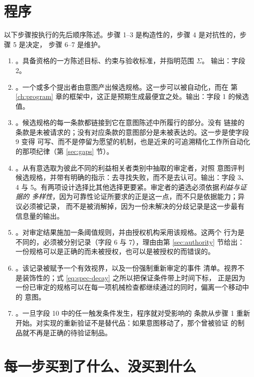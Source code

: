 \section{程序}

以下步骤按执行的先后顺序陈述。步骤 1--3 是构造性的，步骤 4 是对抗性的，步骤 5 是决定，
步骤 6--7 是维护。

\begin{enumerate}[label=\textbf{P\arabic*.},leftmargin=*]
\item {}。具备资格的一方陈述目标、约束与验收标准，并指明范围 $\Sigma$。
      输出：字段 2。
\item {}。一个或多个提出者由意图产出候选规格。这一步可以被自动化，而在
      第 \ref{ch:program} 章的框架中，这正是预期生成最便宜之处。输出：字段 1 的候选值。
\item {}。候选规格的每一条款都链接到它在意图陈述中所履行的部分。没有
      链接的条款是未被请求的；没有对应条款的意图部分是未被表达的。这一步是使字段 9 变得
      可写、而不是停留为愿望的机制，也是近来的可追溯精化工作所自动化的那项纪律（第
      \ref{sec:gaps} 节）。
\item {}。从有意选取为彼此不同的利益相关者类别中抽取的审定者，对照
      意图评判候选规格，并带有明确的指示：去寻找失败，而不是去认可。输出：字段 3、4
      与 5。有两项设计选择比其他选择更要紧。审定者的遴选必须依据\emph{利益与证据的
      多样性}，因为可靠性论证所要求的正是这一点，而不只是依据能力；异议必须被记录，
      而不是被消解掉，因为一份未解决的分歧记录是这一步最有信息量的输出。
\item {}。对审定结果施加一条阈值规则，并由授权机构采用该规格。这两个
      行为是不同的，必须被分别记录（字段 6 与 7），理由由第 \ref{sec:authority} 节给出：
      一份规格可以是正确的而未被授权，也可以是被授权的而错误的。
\item {}。该记录被赋予一个有效视界，以及一份强制重新审定的事件
      清单。视界不是装饰性的；式 \eqref{eq:spec-decay} 之所以把保证条件带上时间下标，
      正是因为一份已审定的规格可以在每一项机械检查都继续通过的同时，偏离一个移动中的
      意图。
\item {}。一旦字段 10 中的任一触发条件发生，程序就对受影响的
      条款从步骤 1 重新开始。对实现的重新验证不是替代品：如果意图移动了，那个曾被验证
      的制品就不再是正确的待验证制品。
\end{enumerate}

\section{每一步买到了什么、没买到什么}

